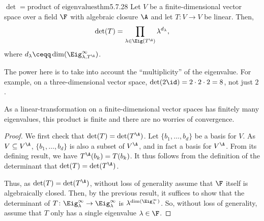 \begin{thm}{$\det =\text{product of eigenvalues}$}{thm5.7.28}
	Let $V$ be a finite-dimensional vector space over a field $\F$ with algebraic closure $\A$ and let $T\colon V\rightarrow V$ be linear.  Then,
	\begin{equation}
		\det (T)=\prod _{\lambda \in \Eig (T^{\A})}\lambda ^{d_{\lambda}},
	\end{equation}
	where $d_{\lambda}\ceqq \dim (\Eig _{\lambda ,T^{\A}}^{\infty})$.
	\begin{rmk}
		The power here is to take into account the ``multiplicity'' of the eigenvalue.  For example, on a three-dimensional vector space, $\det (2\id )=2\cdot 2\cdot 2=8$, not just $2$.
	\end{rmk}
	\begin{rmk}
		As a linear-transformation on a finite-dimensional vector spaces has finitely many eigenvalues, this product is finite and there are no worries of convergence.
	\end{rmk}
	\begin{proof}
		We first check that $\det (T)=\det (T^{\A})$.  Let $\{ b_1,\ldots ,b_d\}$ be a basis for $V$.  As $V\subseteq V^{\A}$, $\{ b_1,\ldots ,b_d\}$ is also a subset of $V^{\A}$, and in fact a basis for $V^{\A}$.  From its defining result, we have $T^{\A}(b_k)=T(b_k)$.  It thus follows from the definition of the determinant that $\det (T)=\det (T^{\A})$.
		
		Thus, as $\det (T)=\det (T^{\A})$, without loss of generality assume that $\F$ itself is algebraically closed.  Then, by the previous result, it suffices to show that the determinant of $T\colon \Eig _{\lambda}^{\infty}\rightarrow \Eig _{\lambda}^{\infty}$ is $\lambda ^{\dim (\Eig _{\lambda}^{\infty})}$.  So, without loss of generality, assume that $T$ only has a single eigenvalue $\lambda \in \F$.
		

\end{proof}
\end{thm}
